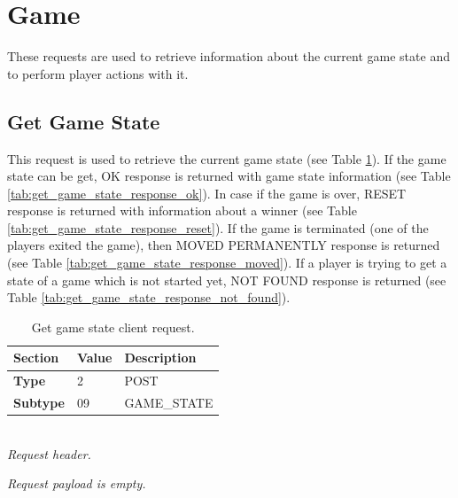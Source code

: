 \documentclass[english, sem, kiv, he, iso690alph, pdf, viewonly]{fasthesis}
\begin{document}
\newpage

\section{Game}
These requests are used to retrieve information about the current game state and to perform player actions with it.

\newpage

\subsection{Get Game State}
This request is used to retrieve the current game state (see Table \ref{tab:get_game_state_request}). If the game state can be get, OK response is returned with game state information (see Table \ref{tab:get_game_state_response_ok}). In case if the game is over, RESET response is returned with information about a winner (see Table \ref{tab:get_game_state_response_reset}). If the game is terminated (one of the players exited the game), then MOVED PERMANENTLY response is returned (see Table \ref{tab:get_game_state_response_moved}). If a player is trying to get a state of a game which is not started yet, NOT FOUND response is returned (see Table \ref{tab:get_game_state_response_not_found}).

\begin{table}[h!]
	\centering
	\begin{minipage}[b]{0.45\textwidth}
		\centering
		\begin{tabular}{|l|l|l|}
			\hline
			\textbf{Section} & \textbf{Value} & \textbf{Description} \\ \hline
			\textbf{Type} & 2 & \footnotesize{POST} \\ \hline
			\textbf{Subtype} & 09 & \footnotesize{GAME\_STATE}  \\ \hline
		\end{tabular} \\
		\textit{Request header.}
	\end{minipage} 
	\hfill
	\begin{minipage}[b]{0.5\textwidth}
		\centering
		\textit{Request payload is empty.}
	\end{minipage}	
	\caption{Get game state client request.}
	\label{tab:get_game_state_request}
\end{table}
\end{document}
